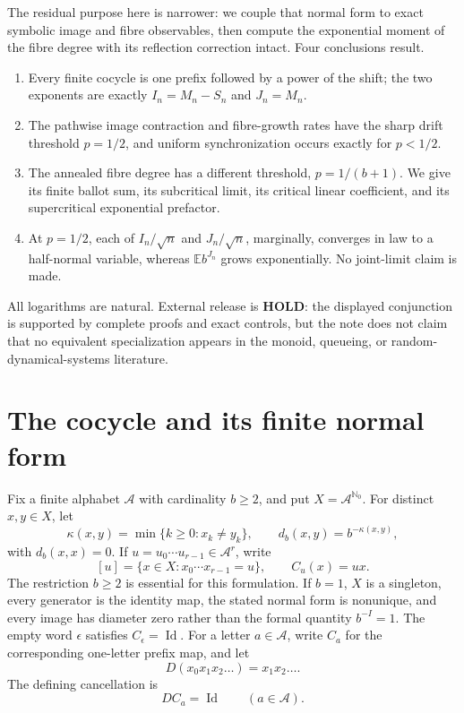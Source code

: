 \documentclass[11pt,a4paper]{amsart}
\theoremstyle{definition}
\theoremstyle{remark}
\newcommand{\A}{\mathcal A}
\newcommand{\N}{\mathbb N}
\newcommand{\Exp}{\mathbb E}
\newcommand{\Id}{\operatorname{Id}}
\newcommand{\cyl}[1]{[#1]}
\begin{document}
The residual purpose here is narrower: we couple that normal form to exact
symbolic image and fibre observables, then compute the exponential moment of
the fibre degree with its reflection correction intact.  Four conclusions
result.
\begin{enumerate}
\item Every finite cocycle is one prefix followed by a power of the shift;
      the two exponents are exactly $I_n=M_n-S_n$ and $J_n=M_n$.
\item The pathwise image contraction and fibre-growth rates have the sharp
      drift threshold $p=1/2$, and uniform synchronization occurs exactly
      for $p<1/2$.
\item The annealed fibre degree has a different threshold,
      $p=1/(b+1)$.  We give its finite ballot sum, its subcritical limit,
      its critical linear coefficient, and its supercritical exponential
      prefactor.
\item At $p=1/2$, each of $I_n/\sqrt n$ and $J_n/\sqrt n$, marginally,
      converges in law to a half-normal variable, whereas
      $\Exp b^{J_n}$ grows exponentially.  No joint-limit claim is made.
\end{enumerate}

All logarithms are natural.  External release is \textbf{HOLD}: the
displayed conjunction is supported by complete proofs and exact controls,
but the note does not claim that no equivalent specialization appears in
the monoid, queueing, or random-dynamical-systems literature.

\section{The cocycle and its finite normal form}
\label{sec:model}

Fix a finite alphabet $\A$ with cardinality $b\geq2$, and put
$X=\A^{\N_0}$.  For distinct $x,y\in X$, let
\[
 \kappa(x,y)=\min\{k\geq0:x_k\neq y_k\},
 \qquad d_b(x,y)=b^{-\kappa(x,y)},
\]
with $d_b(x,x)=0$.  If $u=u_0\cdots u_{r-1}\in\A^r$, write
\[
 \cyl{u}=\{x\in X:x_0\cdots x_{r-1}=u\},
 \qquad C_u(x)=ux.
\]
The restriction $b\geq2$ is essential for this formulation.  If $b=1$,
$X$ is a singleton, every generator is the identity map, the stated normal
form is nonunique, and every image has diameter zero rather than the formal
quantity $b^{-I}=1$.
The empty word $\epsilon$ satisfies $C_\epsilon=\Id$.  For a letter
$a\in\A$, write $C_a$ for the corresponding one-letter prefix map, and let
\[
 D(x_0x_1x_2\ldots)=x_1x_2\ldots .
\]
The defining cancellation is
\begin{equation}\label{eq:cancellation}
 DC_a=\Id\qquad(a\in\A).
\end{equation}
\end{document}
